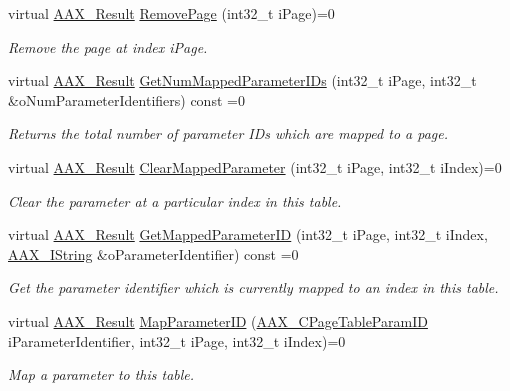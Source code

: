\begin{DoxyCompactItemize}
virtual \mbox{\hyperlink{a00392_a4d8f69a697df7f70c3a8e9b8ee130d2f}{A\+A\+X\+\_\+\+Result}} \mbox{\hyperlink{a01849_a2e5def73da595907d6486ff199168dd3}{Remove\+Page}} (int32\+\_\+t i\+Page)=0
\begin{DoxyCompactList}\small\item\em Remove the page at index {\ttfamily i\+Page}. \end{DoxyCompactList}\item 
virtual \mbox{\hyperlink{a00392_a4d8f69a697df7f70c3a8e9b8ee130d2f}{A\+A\+X\+\_\+\+Result}} \mbox{\hyperlink{a01849_a010687dbfe12a232c393e3af03ea1ef0}{Get\+Num\+Mapped\+Parameter\+I\+Ds}} (int32\+\_\+t i\+Page, int32\+\_\+t \&o\+Num\+Parameter\+Identifiers) const =0
\begin{DoxyCompactList}\small\item\em Returns the total number of parameter I\+Ds which are mapped to a page. \end{DoxyCompactList}\item 
virtual \mbox{\hyperlink{a00392_a4d8f69a697df7f70c3a8e9b8ee130d2f}{A\+A\+X\+\_\+\+Result}} \mbox{\hyperlink{a01849_a9ed083c1f88d39608528cd09e294585c}{Clear\+Mapped\+Parameter}} (int32\+\_\+t i\+Page, int32\+\_\+t i\+Index)=0
\begin{DoxyCompactList}\small\item\em Clear the parameter at a particular index in this table. \end{DoxyCompactList}\item 
virtual \mbox{\hyperlink{a00392_a4d8f69a697df7f70c3a8e9b8ee130d2f}{A\+A\+X\+\_\+\+Result}} \mbox{\hyperlink{a01849_a04689a277ec015d01f2bb7a5530b86bd}{Get\+Mapped\+Parameter\+ID}} (int32\+\_\+t i\+Page, int32\+\_\+t i\+Index, \mbox{\hyperlink{a01873}{A\+A\+X\+\_\+\+I\+String}} \&o\+Parameter\+Identifier) const =0
\begin{DoxyCompactList}\small\item\em Get the parameter identifier which is currently mapped to an index in this table. \end{DoxyCompactList}\item 
virtual \mbox{\hyperlink{a00392_a4d8f69a697df7f70c3a8e9b8ee130d2f}{A\+A\+X\+\_\+\+Result}} \mbox{\hyperlink{a01849_a5b089c92962c045e8df1e0f277d23786}{Map\+Parameter\+ID}} (\mbox{\hyperlink{a00392_ab4e01b971dac1b25632fd9f710dd8f77}{A\+A\+X\+\_\+\+C\+Page\+Table\+Param\+ID}} i\+Parameter\+Identifier, int32\+\_\+t i\+Page, int32\+\_\+t i\+Index)=0
\begin{DoxyCompactList}\small\item\em Map a parameter to this table. \end{DoxyCompactList}\item 

\end{DoxyCompactItemize}
